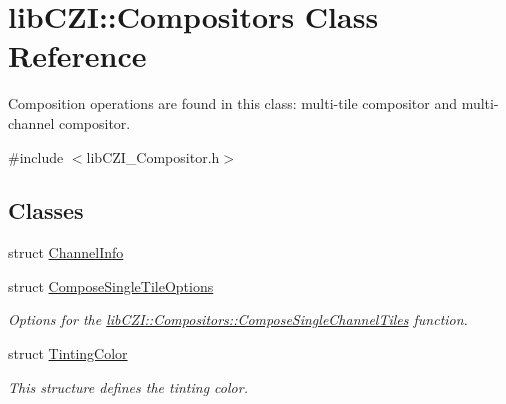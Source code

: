 \hypertarget{classlib_c_z_i_1_1_compositors}{}\section{lib\+C\+ZI\+:\+:Compositors Class Reference}
\label{classlib_c_z_i_1_1_compositors}


Composition operations are found in this class\+: multi-\/tile compositor and multi-\/channel compositor.  




{\ttfamily \#include $<$lib\+C\+Z\+I\+\_\+\+Compositor.\+h$>$}

\subsection*{Classes}
\begin{DoxyCompactItemize}
\item 
struct \hyperlink{structlib_c_z_i_1_1_compositors_1_1_channel_info}{Channel\+Info}
\item 
struct \hyperlink{structlib_c_z_i_1_1_compositors_1_1_compose_single_tile_options}{Compose\+Single\+Tile\+Options}
\begin{DoxyCompactList}\small\item\em Options for the \hyperlink{classlib_c_z_i_1_1_compositors_a8b39ab77c8b83a5a5a8a7e1773e8ad7a}{lib\+C\+Z\+I\+::\+Compositors\+::\+Compose\+Single\+Channel\+Tiles} function. \end{DoxyCompactList}\item 
struct \hyperlink{structlib_c_z_i_1_1_compositors_1_1_tinting_color}{Tinting\+Color}
\begin{DoxyCompactList}\small\item\em This structure defines the tinting color. \end{DoxyCompactList}\end{DoxyCompactItemize}
